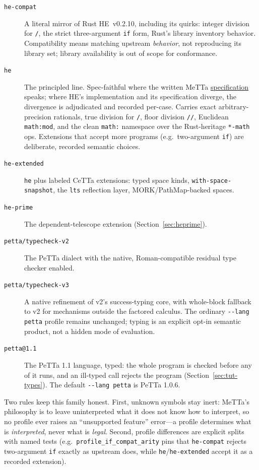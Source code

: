 \documentclass[11pt]{article}
\newcommand{\code}[1]{\texttt{#1}}
\newcommand{\PeTTa}{\textup{PeTTa}}
\newcommand{\HE}{\textup{HE}}
\newcommand{\CeTTa}{\textup{CeTTa}}
\begin{document}
\begin{description}
\item[\code{he-compat}] A literal mirror of Rust \HE{}~v0.2.10,
  including its quirks: integer division for \code{/}, the strict
  three-argument \code{if} form, Rust's library inventory behavior.
  Compatibility means matching upstream \emph{behavior}, not
  reproducing its library set; library availability is out of scope
  for conformance.
\item[\code{he}] The principled line.  Spec-faithful where the written
  MeTTa \href{https://trueagi-io.github.io/hyperon-experimental/metta/}{specification}
  speaks; where \HE{}'s implementation and its
  specification diverge, the divergence is adjudicated and recorded
  per-case.  Carries exact arbitrary-precision rationals, true
  division for \code{/}, floor division \code{//}, Euclidean
  \code{math:mod}, and the clean \code{math:} namespace over the
  Rust-heritage \code{*-math} ops.  Extensions that accept more
  programs (e.g.\ two-argument \code{if}) are deliberate, recorded
  semantic choices.
\item[\code{he-extended}] \code{he} plus labeled \CeTTa{} extensions:
  typed space kinds, \code{with-space-snapshot}, the \code{lts}
  reflection layer, MORK/PathMap-backed spaces.
\item[\code{he-prime}] The dependent-telescope extension
  (Section~\ref{sec:heprime}).
\item[\code{petta/typecheck-v2}] The \PeTTa{} dialect with the native,
  Roman-compatible residual type checker enabled.
\item[\code{petta/typecheck-v3}] A native refinement of v2's success-typing
  core, with whole-block fallback to v2 for mechanisms outside the factored
  calculus.  The ordinary \code{-{}-lang petta} profile remains unchanged;
  typing is an explicit opt-in semantic product, not a hidden mode of
  evaluation.
\item[\code{petta@1.1}] The \PeTTa{} 1.1 language, typed: the whole program
  is checked before any of it runs, and an ill-typed call rejects the program
  (Section~\ref{sec:tut-types}).  The default \code{-{}-lang petta} is
  \PeTTa{} 1.0.6.
\end{description}

Two rules keep this family honest.  First, unknown symbols stay
inert: MeTTa's philosophy is to leave uninterpreted what it does not
know how to interpret, so no profile ever raises an ``unsupported
feature'' error---a profile determines what is \emph{interpreted},
never what is \emph{legal}.  Second, profile differences are explicit
splits with named tests (e.g.\ \code{profile\_if\_compat\_arity}
pins that \code{he-compat} rejects two-argument \code{if} exactly as
upstream does, while \code{he}/\code{he-extended} accept it as a
recorded extension).
\end{document}
